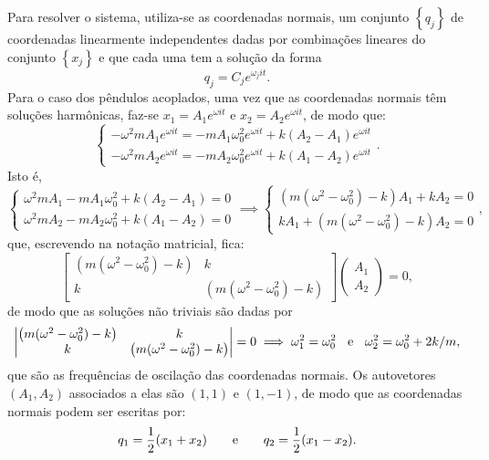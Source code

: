 \documentclass[a4paper, 11pt]{article}
\begin{document}
	Para resolver o sistema, utiliza-se as coordenadas normais, um conjunto $\left\lbrace q_j\right\rbrace$ de coordenadas linearmente independentes dadas por combinações lineares do conjunto $\left\lbrace x_j\right\rbrace$ e que cada uma tem a solução da forma
	\begin{equation}
	q_j = C_je^{\omega_jit}.
	\end{equation}
Para o caso dos pêndulos acoplados, uma vez que as coordenadas normais têm soluções harmônicas, faz-se $x_1 = A_1e^{\omega it}$ e $x_2 = A_2e^{\omega it}$, de modo que:
	\begin{equation}
	\begin{cases}
	-\omega^2mA_1e^{\omega it} = - mA_1\omega_0^2e^{\omega it} + k (A_2-A_1)e^{\omega it}\\
	-\omega^2mA_2e^{\omega it} = - mA_2\omega_0^2e^{\omega it} + k (A_1-A_2)e^{\omega it}
	\end{cases}.
	\end{equation}
Isto é,
	\begin{equation}
	\begin{cases}
		\omega^2mA_1 - mA_1\omega_0^2 + k (A_2-A_1) = 0 \\
		\omega^2mA_2 - mA_2\omega_0^2 + k (A_1-A_2) = 0
	\end{cases}
	\implies
	\begin{cases}
		\left( m(\omega^2-\omega_0^2) - k\right) A_1 + k A_2 = 0  \\
		kA_1 + \left( m(\omega^2-\omega_0^2) - k\right) A_2 = 0 
	\end{cases},
	\end{equation}
que, escrevendo na notação matricial, fica:
	\begin{equation}
	\left[\begin{matrix}
	\left( m(\omega^2-\omega_0^2) - k\right) & k \\
	k & \left( m(\omega^2-\omega_0^2) - k\right)
	\end{matrix}\right]
	\left(\begin{matrix}
	A_1\\
	A_2
	\end{matrix}\right)
	= 0,
	\end{equation}
de modo que as soluções não triviais são dadas por
	\begin{equation}
	\left|\begin{matrix}
	\left( m(\omega^2-\omega_0^2) - k\right) & k \\
	k & \left( m(\omega^2-\omega_0^2) - k\right)
	\end{matrix}\right|
	= 0 \implies \omega_1^2 = \omega_0^2 \hspace{0.2cm}\text{ e }\hspace{0.2cm} \omega_2^2 = \omega_0^2+2k/m,
	\end{equation}
que são as frequências de oscilação das coordenadas normais. Os autovetores $(A_1,A_2)$ associados a elas são $(1,1)$ e $(1,-1)$, de modo que as coordenadas normais podem ser escritas por:
	\begin{equation}
	q_1 = \dfrac{1}{2}(x_1+x_2) \hspace{0.7cm}\text{e}\hspace{0.7cm} 	q_2 = \dfrac{1}{2}(x_1 - x_2).
	\end{equation}
\end{document}
